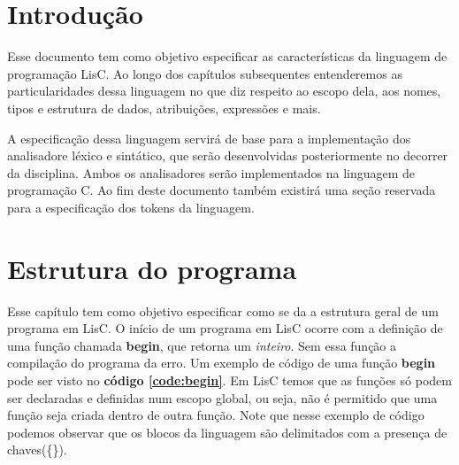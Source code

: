 \documentclass[
  12pt,				%
  oneside,			%
  a4paper,			%
  english,			%
  french,				%
  spanish,			%
  brazil,				%
]{abntex2}
\begin{document}
\frenchspacing 


\imprimircapa

\imprimirfolhaderosto*


\tableofcontents*

\textual
\chapter{Introdução}
\label{cha:intro}
Esse documento tem como objetivo especificar as características da
linguagem de programação LisC. Ao longo dos capítulos subsequentes
entenderemos as particularidades dessa linguagem no que diz respeito
ao escopo dela, aos nomes, tipos e estrutura de dados, atribuições,
expressões e mais.

A especificação dessa linguagem servirá de base para a implementação
dos analisadore léxico e sintático, que serão desenvolvidas
posteriormente no decorrer da disciplina. Ambos os analisadores serão
implementados na linguagem de programação C. Ao fim deste documento
também existirá uma seção reservada para a especificação dos tokens da
linguagem.


\chapter{Estrutura do programa}
\label{cha:estrutura-do-programa}
Esse capítulo tem como objetivo especificar como se da a estrutura
geral de um programa em LisC. O início de um programa em LisC ocorre
com a definição de uma função chamada \textbf{begin}, que retorna um
\emph{inteiro}. Sem essa função a compilação do programa da erro. Um
exemplo de código de uma função \textbf{begin} pode ser visto no
\textbf{código \ref{code:begin}}.
Em LisC temos que as funções só podem ser declaradas e definidas num
escopo global, ou seja, não é permitido que uma função seja criada
dentro de outra função. Note que nesse exemplo de código podemos
observar que os blocos da linguagem são delimitados com a presença
de chaves(\{\}).
\end{document}
